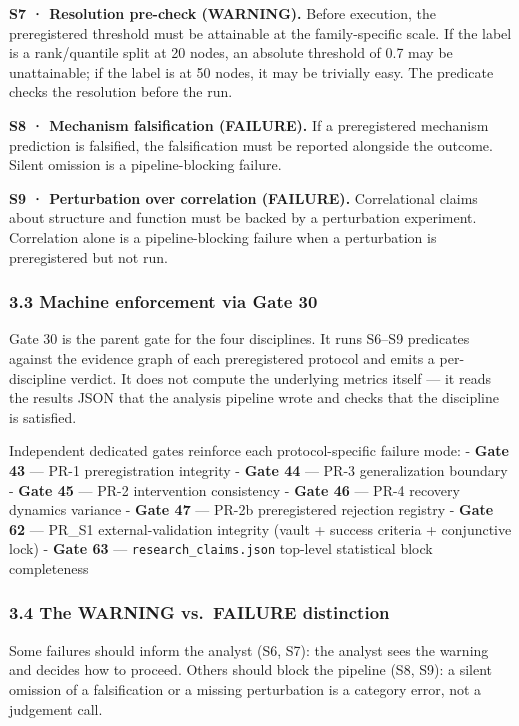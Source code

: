 \documentclass[
]{article}
\begin{document}
\textbf{S7 · Resolution pre-check (WARNING).} Before execution, the
preregistered threshold must be attainable at the family-specific scale.
If the label is a rank/quantile split at 20 nodes, an absolute threshold
of 0.7 may be unattainable; if the label is at 50 nodes, it may be
trivially easy. The predicate checks the resolution before the run.

\textbf{S8 · Mechanism falsification (FAILURE).} If a preregistered
mechanism prediction is falsified, the falsification must be reported
alongside the outcome. Silent omission is a pipeline-blocking failure.

\textbf{S9 · Perturbation over correlation (FAILURE).} Correlational
claims about structure and function must be backed by a perturbation
experiment. Correlation alone is a pipeline-blocking failure when a
perturbation is preregistered but not run.

\subsubsection{3.3 Machine enforcement via Gate
30}\label{machine-enforcement-via-gate-30}

Gate 30 is the parent gate for the four disciplines. It runs S6--S9
predicates against the evidence graph of each preregistered protocol and
emits a per-discipline verdict. It does not compute the underlying
metrics itself --- it reads the results JSON that the analysis pipeline
wrote and checks that the discipline is satisfied.

Independent dedicated gates reinforce each protocol-specific failure
mode: - \textbf{Gate 43} --- PR-1 preregistration integrity -
\textbf{Gate 44} --- PR-3 generalization boundary - \textbf{Gate 45} ---
PR-2 intervention consistency - \textbf{Gate 46} --- PR-4 recovery
dynamics variance - \textbf{Gate 47} --- PR-2b preregistered rejection
registry - \textbf{Gate 62} --- PR\_S1 external-validation integrity
(vault + success criteria + conjunctive lock) - \textbf{Gate 63} ---
\texttt{research\_claims.json} top-level statistical block completeness

\subsubsection{3.4 The WARNING vs.~FAILURE
distinction}\label{the-warning-vs.-failure-distinction}

Some failures should inform the analyst (S6, S7): the analyst sees the
warning and decides how to proceed. Others should block the pipeline
(S8, S9): a silent omission of a falsification or a missing perturbation
is a category error, not a judgement call.
\end{document}

